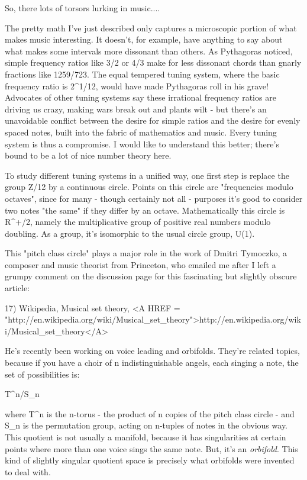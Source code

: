 So, there lots of torsors lurking in music....

The pretty math I've just described only captures a microscopic 
portion of what makes music interesting.  It doesn't, for example,
have anything to say about what makes some intervals more dissonant
than others.  As Pythagoras noticed, simple frequency ratios like 
3/2 or 4/3 make for less dissonant chords than gnarly fractions 
like 1259/723.  The equal tempered tuning system, where the basic
frequency ratio is 2^{1/12}, would have made Pythagoras roll in 
his grave!   Advocates of other tuning systems say these irrational 
frequency ratios are driving us crazy, making wars break out and 
plants wilt - but there's an unavoidable conflict between the desire 
for simple ratios and the desire for evenly spaced notes, built into 
the fabric of mathematics and music.  Every tuning system is thus a
compromise.  I would like to understand this better; there's bound 
to be a lot of nice number theory here.

To study different tuning systems in a unified way, one first step
is replace the group Z/12 by a continuous circle.  Points on this
circle are "frequencies modulo octaves", since for many - though 
certainly not all - purposes it's good to consider two notes 
"the same" if they differ by an octave.  Mathematically this circle 
is R^{+}/2, namely the multiplicative group of positive real numbers 
modulo doubling.  As a group, it's isomorphic to the usual circle
group, U(1). 

This "pitch class circle" plays a major role in the work of Dmitri 
Tymoczko, a composer and music theorist from Princeton, who emailed 
me after I left a grumpy comment on the discussion page for this 
fascinating but slightly obscure article:

17) Wikipedia, Musical set theory,
<A HREF = "http://en.wikipedia.org/wiki/Musical_set_theory">http://en.wikipedia.org/wiki/Musical_set_theory</A>

He's recently been working on voice leading and orbifolds.  They're 
related topics, because if you have a choir of n indistinguishable 
angels, each singing a note, the set of possibilities is:

T^{n}/S_{n}

where T^{n} is the n-torus - the product of n copies of the
pitch class circle - and S_{n} is the permutation group,
acting on n-tuples of notes in the obvious way.  This quotient is not
usually a manifold, because it has singularities at certain points
where more than one voice sings the same note.  But, it's an
\emph{orbifold}.  This kind of slightly singular quotient space is
precisely what orbifolds were invented to deal with.

